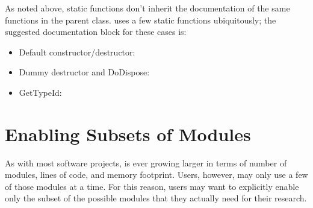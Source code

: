 \documentclass[letterpaper,10pt,english]{sphinxmanual}
\begin{document}
As noted above, static functions don’t inherit the documentation
of the same functions in the parent class.   uses a few static
functions ubiquitously; the suggested documentation block for these
cases is:
\begin{itemize}
\item {} 
Default constructor/destructor:

\begin{sphinxVerbatim}[commandchars=\\\{\}]
    
   
\end{sphinxVerbatim}

\item {} 
Dummy destructor and DoDispose:

\begin{sphinxVerbatim}[commandchars=\\\{\}]
 

   
\end{sphinxVerbatim}

\item {} 
GetTypeId:

\begin{sphinxVerbatim}[commandchars=\\\{\}]
   
\end{sphinxVerbatim}

\end{itemize}


\section{Enabling Subsets of  Modules}
\label{\detokenize{enable-modules:enabling-subsets-of-ns3-modules}}\label{\detokenize{enable-modules::doc}}
As with most software projects,  is ever growing larger in terms of number of modules, lines of code, and memory footprint.  Users, however, may only use a few of those modules at a time.  For this reason, users may want to explicitly enable only the subset of the possible  modules that they actually need for their research.
\end{document}
